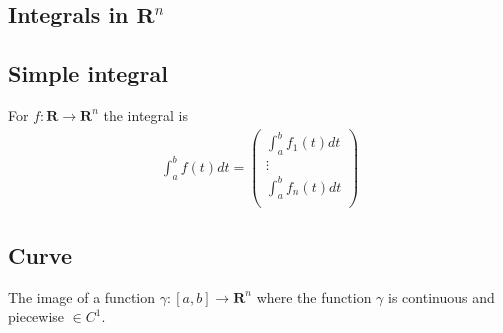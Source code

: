 \documentclass[8pt]{extarticle}
\newcommand{\R}{{\mathbb R}}
\newcommand{\ra}{{\rightarrow}}
\def\R{\mathbf{R}}
\begin{document}
\begin{multicols*}{3}
  \section{Integrals in $\R^n$}
  \hypertarget{sec:2}{}
  \subsection{Simple integral}
  For $f: \R \ra \R^n$ the integral is
  \begin{align*}
    \int_a^b f(t) dt =
    \begin{pmatrix}
      \int_a^b f_1(t) dt \\
      \vdots             \\
      \int_a^b f_n(t) dt \\
    \end{pmatrix}
  \end{align*}
  \subsection{Curve}
  The image of a function $\gamma: [a, b] \ra \R^n$
  where the function $\gamma$ is continuous and piecewise $\in C^1$.\\ \\

\end{multicols*}
\end{document}
